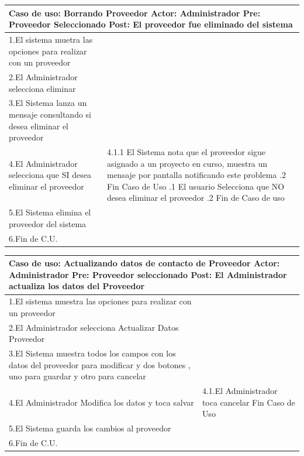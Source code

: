\begin{longtable}{| p{} | p{} |} 
    \hline
    \multicolumn{2}{|p{16cm}|}{
        \textbf{Caso de uso:} Borrando Proveedor \newline
        \textbf{Actor:} Administrador\newline
        \textbf{Pre:}  Proveedor Seleccionado\newline
        \textbf{Post:} El proveedor fue eliminado del sistema
    }\\
    \hline
    1.El sistema  muetra las opciones para realizar con un proveedor & \\
    \hline
    2.El Administrador selecciona eliminar& \\
    \hline
    3.El Sistema lanza un mensaje consultando si desea eliminar el proveedor &  \\
    \hline
    4.El Administrador selecciona que SI desea eliminar el proveedor & 4.1.1 El Sistema nota que el proveedor sigue asignado a un proyecto en curso, muestra un mensaje por pantalla notificando este problema \newline 4.1.2 Fin Caso de Uso \newline 4.2.1 El usuario Selecciona que NO desea eliminar el proveedor \newline4.2.2 Fin de Caso de uso\\
    \hline
    5.El Sistema elimina el proveedor del sistema &  \\
    \hline
    6.Fin de C.U.& \\
    \hline
\end{longtable}
\begin{longtable}{|p{}|p{}|}
    \hline
    \multicolumn{2}{|p{16cm}|}{
        \textbf{Caso de uso:} Actualizando datos de contacto de Proveedor \newline
        \textbf{Actor:} Administrador\newline
        \textbf{Pre:}  Proveedor seleccionado\newline
        \textbf{Post:} El Administrador actualiza los datos del Proveedor
    }\\
    \hline
    1.El sistema  muestra las opciones para realizar con un proveedor & \\
    \hline
    2.El Administrador selecciona Actualizar Datos Proveedor&   \\
    \hline
    3.El Sistema muestra todos los campos con los datos del proveedor para modificar y dos botones , uno para guardar y otro para cancelar&  \\
    \hline
    4.El Administrador Modifica los datos y toca salvar & 4.1.El Administrador toca cancelar \newline 4.2 Fin Caso de Uso \\
    \hline
    5.El Sistema guarda los cambios al proveedor &  \\
    \hline
    6.Fin de C.U.& \\
    \hline
\end{longtable}

